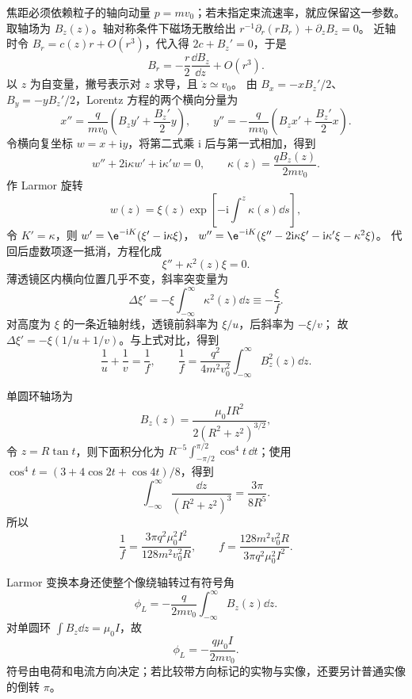 \begin{xesolution}
焦距必须依赖粒子的轴向动量 $p=mv_0$；若未指定束流速率，就应保留这一参数。
取轴场为 $B_z(z)$。轴对称条件下磁场无散给出
$r^{-1}\partial_r(rB_r)+\partial_z B_z=0$。
近轴时令 $B_r=c(z)r+O(r^3)$，代入得 $2c+B_z'=0$，于是
\begin{equation}
  B_r=-\frac r2\frac{\dd B_z}{\dd z}+O(r^3).
\end{equation}
以 $z$ 为自变量，撇号表示对 $z$ 求导，且 $\dot z\simeq v_0$。
由 $B_x=-xB_z'/2$、$B_y=-yB_z'/2$，Lorentz 方程的两个横向分量为
\[
 x''=\frac q{mv_0}\left(B_z y'+\frac{B_z'}2y\right),\qquad
 y''=-\frac q{mv_0}\left(B_z x'+\frac{B_z'}2x\right).
\]
令横向复坐标 $w=x+\mathrm i y$，将第二式乘 $\mathrm i$ 后与第一式相加，得到
\begin{equation}
  w''+2\mathrm i\kappa w'+\mathrm i\kappa'w=0,
  \qquad
  \kappa(z)=\frac{qB_z(z)}{2mv_0}.
\end{equation}
作 Larmor 旋转
\[
  w(z)=\xi(z)\exp\!\left[-\mathrm i\int^z\kappa(s)\dd s\right],
\]
令 $K'=\kappa$，则 $w'=\e^{-\mathrm iK}(\xi'-\mathrm i\kappa\xi)$，
$w''=\e^{-\mathrm iK}(\xi''-2\mathrm i\kappa\xi'-\mathrm i\kappa'\xi-\kappa^2\xi)$。
代回后虚数项逐一抵消，方程化成
\begin{equation}
  \xi''+\kappa^2(z)\xi=0.
\end{equation}
薄透镜区内横向位置几乎不变，斜率突变量为
\[
  \Delta\xi'=-\xi\int_{-\infty}^{\infty}\kappa^2(z)\dd z
  \equiv-\frac{\xi}{f}.
\]
对高度为 $\xi$ 的一条近轴射线，透镜前斜率为 $\xi/u$，后斜率为 $-\xi/v$；
故 $\Delta\xi'=-\xi(1/u+1/v)$。与上式对比，得到
\begin{equation}
  \boxed{\frac1u+\frac1v=\frac1f},
  \qquad
  \boxed{\frac1f=\frac{q^2}{4m^2v_0^2}
  \int_{-\infty}^{\infty}B_z^2(z)\dd z}.
\end{equation}

单圆环轴场为
\[
  B_z(z)=\frac{\mu_0IR^2}{2(R^2+z^2)^{3/2}},
\]
令 $z=R\tan t$，则下面积分化为
$R^{-5}\int_{-\pi/2}^{\pi/2}\cos^4t\,\dd t$；使用
$\cos^4t=(3+4\cos2t+\cos4t)/8$，得到
\[
  \int_{-\infty}^{\infty}\frac{\dd z}{(R^2+z^2)^3}
  =\frac{3\pi}{8R^5}.
\]
所以
\begin{equation}
  \boxed{\frac1f=\frac{3\pi q^2\mu_0^2I^2}{128m^2v_0^2R}},
  \qquad
  \boxed{f=\frac{128m^2v_0^2R}{3\pi q^2\mu_0^2I^2}}.
\end{equation}

Larmor 变换本身还使整个像绕轴转过有符号角
\begin{equation}
  \phi_L=-\frac{q}{2mv_0}\int_{-\infty}^{\infty}B_z(z)\dd z.
\end{equation}
对单圆环 $\int B_z\dd z=\mu_0I$，故
\begin{equation}
  \boxed{\phi_L=-\frac{q\mu_0I}{2mv_0}}.
\end{equation}
符号由电荷和电流方向决定；若比较带方向标记的实物与实像，还要另计普通实像的倒转 $\pi$。


\end{xesolution}

